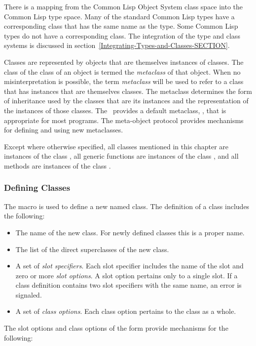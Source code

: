 There is a mapping from the Common Lisp Object System class space into
the Common Lisp type space.  Many of the standard Common Lisp types
have a corresponding
class that has the same name as the type.  Some Common Lisp types do
not have a corresponding class.  The integration of the type and class
systems is discussed in section~\ref{Integrating-Types-and-Classes-SECTION}.

Classes are represented by objects that are themselves
instances of classes.  The class of the class of an object is termed
the \emph{metaclass\/} of that object.  When no misinterpretation is
possible, the term \emph{metaclass\/} will be used to refer to a class
that has instances that are themselves classes.  The metaclass
determines the form of inheritance used by the classes that are its
instances and the representation of the instances of those classes.
The \CLOS\ provides a default metaclass, , that is
appropriate for most programs.  The meta-object protocol provides
mechanisms for defining and using new metaclasses.

Except where otherwise specified, all classes mentioned in this
chapter are instances of the class , all generic
functions are instances of the class ,
and all methods are instances of the class .

\subsubsection{Defining Classes}

The macro  is used to define a new named class.
The definition of a class includes the following:

\begin{itemize}

\item  The name of the new class. For newly defined classes
this is a proper name.

\item  The list of the direct superclasses of the new class. 

\item  A set of \emph{slot specifiers}.  Each slot specifier
includes the name of the slot and zero or more \emph{slot options}.  A
slot option pertains only to a single slot. If a class definition
contains two slot specifiers with the same name, an error is signaled.

\item  A set of \emph{class options}.  Each class option pertains 
to the class as a whole.  
\end{itemize}
The slot options and class options of the  form provide
mechanisms for the following:

